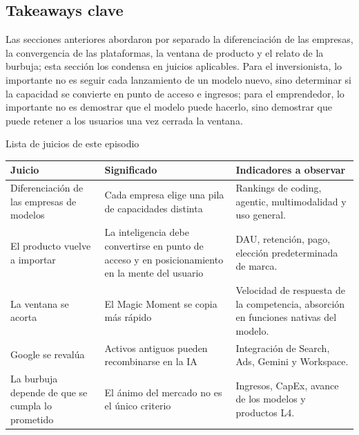 \documentclass[a4paper]{article}
\begin{document}
\subsection{Takeaways clave}

Las secciones anteriores abordaron por separado la diferenciación de las empresas, la convergencia de las plataformas, la ventana de producto y el relato de la burbuja; esta sección los condensa en juicios aplicables. Para el inversionista, lo importante no es seguir cada lanzamiento de un modelo nuevo, sino determinar si la capacidad se convierte en punto de acceso e ingresos; para el emprendedor, lo importante no es demostrar que el modelo puede hacerlo, sino demostrar que puede retener a los usuarios una vez cerrada la ventana.

\begin{knowledgebox}{Lista de juicios de este episodio}
\begin{tabularx}{\textwidth}{p{}p{}X}
\toprule
Juicio & Significado & Indicadores a observar \\
\midrule
Diferenciación de las empresas de modelos & Cada empresa elige una pila de capacidades distinta & Rankings de coding, agentic, multimodalidad y uso general. \\
El producto vuelve a importar & La inteligencia debe convertirse en punto de acceso y en posicionamiento en la mente del usuario & DAU, retención, pago, elección predeterminada de marca. \\
La ventana se acorta & El Magic Moment se copia más rápido & Velocidad de respuesta de la competencia, absorción en funciones nativas del modelo. \\
Google se revalúa & Activos antiguos pueden recombinarse en la IA & Integración de Search, Ads, Gemini y Workspace. \\
La burbuja depende de que se cumpla lo prometido & El ánimo del mercado no es el único criterio & Ingresos, CapEx, avance de los modelos y productos L4. \\
\bottomrule
\end{tabularx}
\end{knowledgebox}
\end{document}
